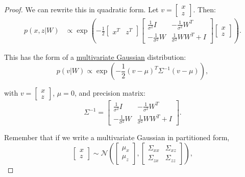 \begin{proof}
    We can rewrite this in quadratic form. Let $v = \begin{bmatrix} x \\ z \end{bmatrix}$. Then:
    \begin{align}
      p(x, z | W) &\propto \exp\left(-\frac{1}{2}\begin{bmatrix} x^T & z^T \end{bmatrix} \begin{bmatrix} \frac{1}{\sigma^2}I & -\frac{1}{\sigma^2}W^T \\ -\frac{1}{\sigma^2}W & \frac{1}{\sigma^2}WW^T + I \end{bmatrix} \begin{bmatrix} x \\ z \end{bmatrix}\right).
    \end{align}

    This has the form of a \hyperref[prob-def:multivariate-gaussian]{multivariate Gaussian} distribution:
    \begin{equation}
      p(v | W) \propto \exp\left(-\frac{1}{2}(v - \mu)^T\Sigma^{-1}(v - \mu)\right),
    \end{equation}

    with $v = \begin{bmatrix} x \\ z \end{bmatrix}$, $\mu = 0$, and precision matrix:
    \begin{equation}
      \Sigma^{-1} = \begin{bmatrix} \frac{1}{\sigma^2}I & -\frac{1}{\sigma^2}W^T \\ -\frac{1}{\sigma^2}W & \frac{1}{\sigma^2}WW^T + I \end{bmatrix}.
    \end{equation}

    Remember that if we write a multivariate Gaussian in partitioned form,
    \begin{equation}
      \begin{bmatrix} x \\ z \end{bmatrix} \sim \mathcal{N}\left(\begin{bmatrix} \mu_x \\ \mu_z \end{bmatrix}, \begin{bmatrix} \Sigma_{xx} & \Sigma_{xz} \\ \Sigma_{zx} & \Sigma_{zz} \end{bmatrix}\right),
    \end{equation}


\end{proof}
